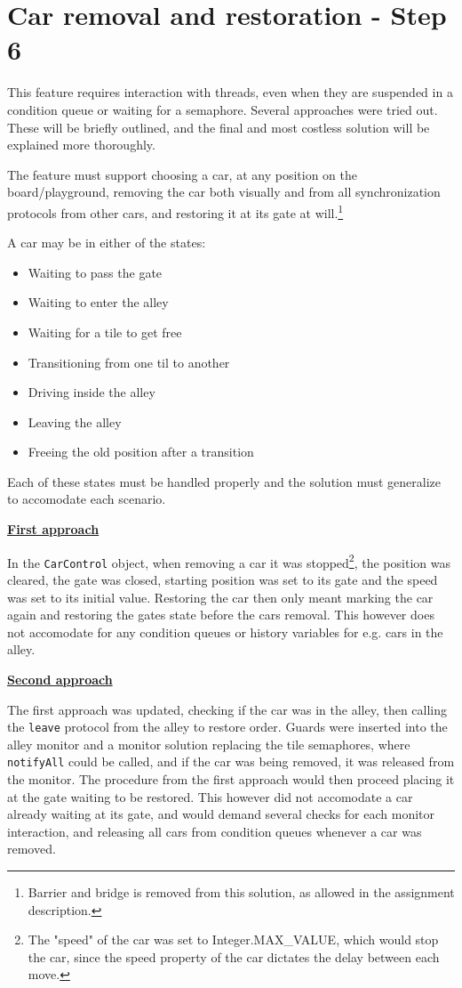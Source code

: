 \section{Car removal and restoration - Step 6}

This feature requires interaction with threads, even when they are suspended in a condition queue or waiting for a semaphore. Several approaches were tried out. These will be briefly outlined, and the final and most costless solution will be explained more thoroughly. 

The feature must support choosing a car, at any position on the board/playground, removing the car both visually and from all synchronization protocols from other cars, and restoring it at its gate at will.\footnote{Barrier and bridge is removed from this solution, as allowed in the assignment description.}

A car may be in either of the states:
\begin{itemize}
    \item Waiting to pass the gate
    \item Waiting to enter the alley
    \item Waiting for a tile to get free
    \item Transitioning from one til to another
    \item Driving inside the alley
    \item Leaving the alley
    \item Freeing the old position after a transition
\end{itemize}

Each of these states must be handled properly and the solution must generalize to accomodate each scenario.

\underline{\textbf{First approach}}

In the \texttt{CarControl} object, when removing a car it was stopped\footnote{The "speed" of the car was set to Integer.MAX\_VALUE, which would stop the car, since the speed property of the car dictates the delay between each move.}, the position was cleared, the gate was closed, starting position was set to its gate and the speed was set to its initial value. Restoring the car then only meant marking the car again and restoring the gates state before the cars removal. This however does not accomodate for any condition queues or history variables for e.g. cars in the alley.

\underline{\textbf{Second approach}}

The first approach was updated, checking if the car was in the alley, then calling the \texttt{leave} protocol from the alley to restore order. Guards were inserted into the alley monitor and a monitor solution replacing the tile semaphores, where \texttt{notifyAll} could be called, and if the car was being removed, it was released from the monitor. The procedure from the first approach would then proceed placing it at the gate waiting to be restored. This however did not accomodate a car already waiting at its gate, and would demand several checks for each monitor interaction, and releasing all cars from condition queues whenever a car was removed.

